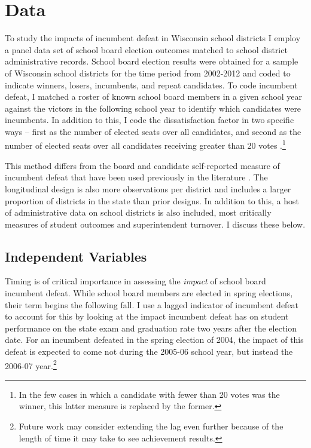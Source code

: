 \section{Data}

To study the impacts of incumbent defeat in Wisconsin school districts I employ 
a panel data set of school board election outcomes matched to school district 
administrative records. School board election results were obtained for a sample 
of Wisconsin school districts for the time period from 2002-2012 and coded to 
indicate winners, losers, incumbents, and repeat candidates. To code incumbent 
defeat, I matched a roster of known school board members in a given school year 
against the victors in the following school year to identify which candidates 
were incumbents. In addition to this, I code the dissatisfaction factor in two 
specific ways -- first as the number of elected seats over all candidates, and 
second as the number of elected seats over all candidates receiving greater than 
20 votes \citep{RefWorks:337}.\footnote{In the few cases in which a candidate 
with fewer than 20 votes was the winner, this latter measure is replaced by the 
former.} 

This method differs from the board and candidate self-reported measure of incumbent 
defeat that have been used previously in the literature \citep{RefWorks:345}. The 
longitudinal design is also more observations per district and includes a larger 
proportion of districts in the state than prior designs. In addition to this, 
a host of administrative data on school districts is also included, most critically 
measures of student outcomes and superintendent turnover. I discuss these below. 

\subsection{Independent Variables}

Timing is of critical importance in assessing the \emph{impact} of school board 
incumbent defeat. While school board members are elected in spring elections, 
their term begins the following fall. I use a lagged indicator of incumbent defeat 
to account for this by looking at the impact incumbent defeat has on student 
performance on the state exam and graduation rate two years after the election date. 
For an incumbent defeated in the spring election of 2004, the impact of this 
defeat is expected to come not during the 2005-06 school year, but instead the 
2006-07 year.\footnote{Future work may consider extending the lag even further 
because of the length of time it may take to see achievement results.}

